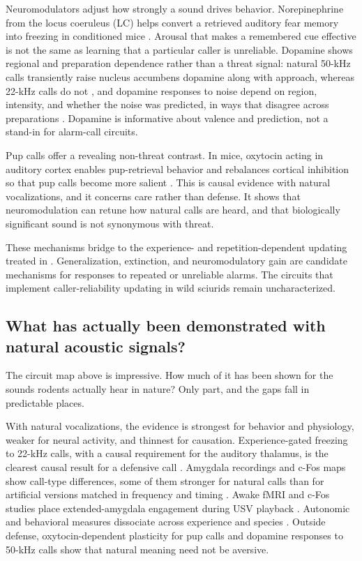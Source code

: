 Neuromodulators adjust how strongly a sound drives behavior. Norepinephrine from the locus coeruleus (LC) helps convert a retrieved auditory fear memory into freezing in conditioned mice \citep{DuanEtAl2025}.
Arousal that makes a remembered cue effective is not the same as learning that a particular caller is unreliable. Dopamine shows regional and preparation dependence rather than a threat signal: natural 50-kHz calls transiently raise nucleus accumbens dopamine along with approach, whereas 22-kHz calls do not \citep{WilluhnEtAl2014}, and dopamine responses to noise depend on region, intensity, and whether the noise was predicted, in ways that disagree across preparations \citep{GoedhoopEtAl2022,FuruyamaEtAl2026}. Dopamine is informative about valence and prediction, not a stand-in for alarm-call circuits.

Pup calls offer a revealing non-threat contrast. In mice, oxytocin acting in auditory cortex enables pup-retrieval behavior and rebalances cortical inhibition so that pup calls become more salient \citep{MarlinEtAl2015}. This is causal evidence with natural vocalizations, and it concerns care rather than defense. It shows that neuromodulation can retune how natural calls are heard, and that biologically significant sound is not synonymous with threat.

These mechanisms bridge to the experience- and repetition-dependent updating treated in . Generalization, extinction, and neuromodulatory gain are candidate mechanisms for responses to repeated or unreliable alarms. The circuits that implement caller-reliability updating in wild sciurids remain uncharacterized.

\subsection{What has actually been demonstrated with natural acoustic signals?}
\label{sec:mechanisms-natural}

The circuit map above is impressive. How much of it has been shown for the sounds rodents actually hear in nature? Only part, and the gaps fall in predictable places.

With natural vocalizations, the evidence is strongest for behavior and physiology, weaker for neural activity, and thinnest for causation. Experience-gated freezing to 22-kHz calls, with a causal requirement for the auditory thalamus, is the clearest causal result for a defensive call \citep{KimEtAl2010}. Amygdala recordings and c-Fos maps show call-type differences, some of them stronger for natural calls than for artificial versions matched in frequency and timing \citep{ParsanaEtAl2012a,SadanandaEtAl2008,OudaEtAl2016}. Awake fMRI and c-Fos studies place extended-amygdala engagement during USV playback \citep{DemaestriEtAl2019,GranataEtAl2024}. Autonomic and behavioral measures dissociate across experience and species \citep{OlszynskiEtAl2020,Mateo1996,EilamEtAl1999}. Outside defense, oxytocin-dependent plasticity for pup calls \citep{MarlinEtAl2015} and dopamine responses to 50-kHz calls \citep{WilluhnEtAl2014} show that natural meaning need not be aversive.

